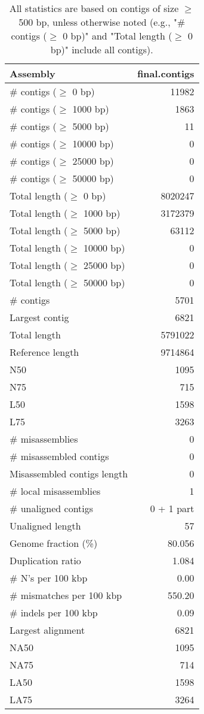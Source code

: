 \documentclass[12pt,a4paper]{article}
\begin{document}
\begin{table}[ht]
\begin{center}
\caption{All statistics are based on contigs of size $\geq$ 500 bp, unless otherwise noted (e.g., "\# contigs ($\geq$ 0 bp)" and "Total length ($\geq$ 0 bp)" include all contigs).}
\begin{tabular}{|l*{1}{|r}|}
\hline
Assembly & final.contigs \\ \hline
\# contigs ($\geq$ 0 bp) & 11982 \\ \hline
\# contigs ($\geq$ 1000 bp) & 1863 \\ \hline
\# contigs ($\geq$ 5000 bp) & 11 \\ \hline
\# contigs ($\geq$ 10000 bp) & 0 \\ \hline
\# contigs ($\geq$ 25000 bp) & 0 \\ \hline
\# contigs ($\geq$ 50000 bp) & 0 \\ \hline
Total length ($\geq$ 0 bp) & 8020247 \\ \hline
Total length ($\geq$ 1000 bp) & 3172379 \\ \hline
Total length ($\geq$ 5000 bp) & 63112 \\ \hline
Total length ($\geq$ 10000 bp) & 0 \\ \hline
Total length ($\geq$ 25000 bp) & 0 \\ \hline
Total length ($\geq$ 50000 bp) & 0 \\ \hline
\# contigs & 5701 \\ \hline
Largest contig & 6821 \\ \hline
Total length & 5791022 \\ \hline
Reference length & 9714864 \\ \hline
N50 & 1095 \\ \hline
N75 & 715 \\ \hline
L50 & 1598 \\ \hline
L75 & 3263 \\ \hline
\# misassemblies & 0 \\ \hline
\# misassembled contigs & 0 \\ \hline
Misassembled contigs length & 0 \\ \hline
\# local misassemblies & 1 \\ \hline
\# unaligned contigs & 0 + 1 part \\ \hline
Unaligned length & 57 \\ \hline
Genome fraction (\%) & 80.056 \\ \hline
Duplication ratio & 1.084 \\ \hline
\# N's per 100 kbp & 0.00 \\ \hline
\# mismatches per 100 kbp & 550.20 \\ \hline
\# indels per 100 kbp & 0.09 \\ \hline
Largest alignment & 6821 \\ \hline
NA50 & 1095 \\ \hline
NA75 & 714 \\ \hline
LA50 & 1598 \\ \hline
LA75 & 3264 \\ \hline
\end{tabular}
\end{center}
\end{table}
\end{document}
